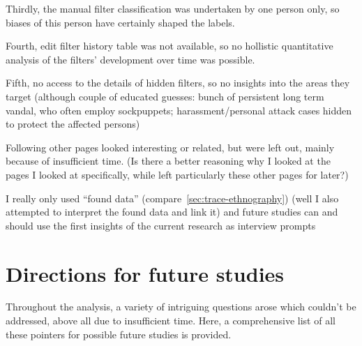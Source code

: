 Thirdly, the manual filter classification was undertaken by one person only, so biases of this person have certainly shaped the labels.

Fourth, edit filter history table was not available, so no hollistic quantitative analysis of the filters' development over time was possible.

Fifth, no access to the details of hidden filters, so no insights into the areas they target (although couple of educated guesses: bunch of persistent long term vandal, who often employ sockpuppets; harassment/personal attack cases hidden to protect the affected persons)


Following other pages looked interesting or related, but were left out, mainly because of insufficient time.
(Is there a better reasoning why I looked at the pages I looked at specifically, while left particularly these other pages for later?)

I really only used ``found data'' (compare~\ref{sec:trace-ethnography}) (well I also attempted to interpret the found data and link it) and future studies can and should use the first insights of the current research as interview prompts


\section{Directions for future studies}
\label{sec:further-studies}

Throughout the analysis, a variety of intriguing questions arose which couldn't be addressed, above all due to insufficient time.
Here, a comprehensive list of all these pointers for possible future studies is provided.

